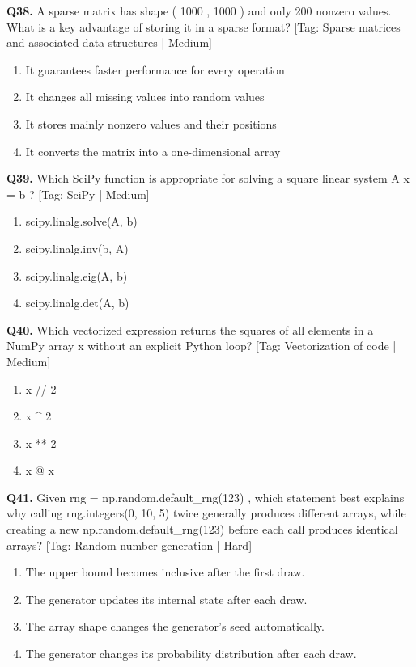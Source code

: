 \vspace{2mm}
\noindent\textbf{Q38.} A sparse matrix has shape ( 1000 , 1000 ) and only 200 nonzero values. What is a key advantage of storing it in a sparse format? \hfill [Tag: Sparse matrices and associated data structures | Medium]
\begin{enumerate}[label=(\alph*),topsep=2pt,itemsep=1pt,partopsep=0pt,parsep=0pt]
    \item {It guarantees faster performance for every operation}
    \item {It changes all missing values into random values}
    \item {It stores mainly nonzero values and their positions}
    \item {It converts the matrix into a one-dimensional array}
\end{enumerate}
\vspace{2mm}
\noindent\textbf{Q39.} Which SciPy function is appropriate for solving a square linear system A x = b ? \hfill [Tag: SciPy | Medium]
\begin{enumerate}[label=(\alph*),topsep=2pt,itemsep=1pt,partopsep=0pt,parsep=0pt]
    \item {scipy.linalg.solve(A, b)}
    \item {scipy.linalg.inv(b, A)}
    \item {scipy.linalg.eig(A, b)}
    \item {scipy.linalg.det(A, b)}
\end{enumerate}
\vspace{2mm}
\noindent\textbf{Q40.} Which vectorized expression returns the squares of all elements in a NumPy array x without an explicit Python loop? \hfill [Tag: Vectorization of code | Medium]
\begin{enumerate}[label=(\alph*),topsep=2pt,itemsep=1pt,partopsep=0pt,parsep=0pt]
    \item {x // 2}
    \item {x \textasciicircum{} 2}
    \item {x ** 2}
    \item {x @ x}
\end{enumerate}
\vspace{2mm}
\noindent\textbf{Q41.} Given rng = np.random.default\_rng(123) , which statement best explains why calling rng.integers(0, 10, 5) twice generally produces different arrays, while creating a new np.random.default\_rng(123) before each call produces identical arrays? \hfill [Tag: Random number generation | Hard]
\begin{enumerate}[label=(\alph*),topsep=2pt,itemsep=1pt,partopsep=0pt,parsep=0pt]
    \item {The upper bound becomes inclusive after the first draw.}
    \item {The generator updates its internal state after each draw.}
    \item {The array shape changes the generator's seed automatically.}
    \item {The generator changes its probability distribution after each draw.}
\end{enumerate}
